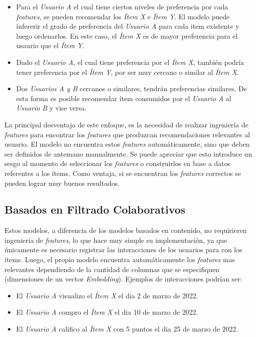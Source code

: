 \documentclass[11pt,a4paper,twoside]{thesis}
\begin{document}
\begin{itemize}
	\item Para el \textit{Usuario A} el cual tiene ciertos niveles de preferencia por
	      cada \textit{features}, se pueden recomendar los \textit{Ítem X} e \textit{Ítem
		      Y}. El modelo puede infererir el grado de preferencia del \textit{Usuario A}
	      para cada item existente y luego ordenarlos. En este caso, el \textit{Ítem X}
	      es de mayor preferencia para el usaurio que el \textit{Ítem Y}.

	\item Dado el \textit{Usuario A}, el cual tiene preferencia por el \textit{Ítem X},
	      también podría tener preferencia por el \textit{Ítem Y}, por ser muy cercano o
	      similar al \textit{Ítem X}.

	\item Dos \textit{Usuarios A y B} cercanos o similares, tendrán preferencias
	      similares. De esta forma es posible recomendar ítem consumidos por el
	      \textit{Usuario A} al \textit{Usuario B} y vise versa.
\end{itemize}

La principal desventaja de este enfoque, es la necesidad de realizar ingeniería
de \textit{features} para encontrar los \textit{features} que produzcan
recomendaciones relevantes al usuario. El modelo no encuentra estos
\textit{features} automáticamente, sino que deben ser definidos de antemano
manualmente. Se puede apreciar que esto introduce un sesgo al momento de
seleccionar los \textit{features} o construirlos en base a datos referentes a
los ítems. Como ventaja, si se encuentran los \textit{features} correctos se
pueden lograr muy buenos resultados.

\subsection{Basados en Filtrado Colaborativos}

Estos modelos, a diferencia de los modelos basados en contenido, no requirieren
ingeniería de \textit{features}, lo que hace muy simple su implementación, ya
que únicamente es necesario registrar las interacciones de los usuarios para
con los ítems. Luego, el propio modelo encuentra automáticamente los
\textit{features} mas relevantes dependiendo de la cantidad de columnas que se
especifiquen (dimensiones de un vector \textit{Embedding}). Ejemplos de
interacciones podrían ser:

\begin{itemize}
	\item El \textit{Usuario A} visualizo el \textit{Ítem X} el dia 2 de marzo de 2022.
	\item El \textit{Usuario A} compro el \textit{Ítem X} el dia 10 de marzo de 2022.
	\item El \textit{Usuario A} califico al \textit{Ítem X} con 5 puntos el dia 25 de
	      marzo de 2022.
\end{itemize}
\end{document}

